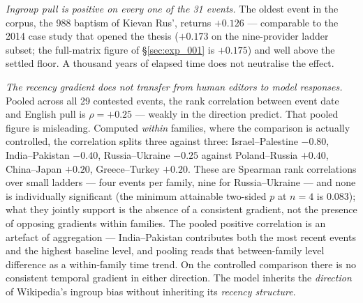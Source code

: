 \emph{Ingroup pull is positive on every one of the 31 events.} The
oldest event in the corpus, the 988 baptism of Kievan Rus', returns
$+0.126$ --- comparable to the 2014 case study that opened the
thesis ($+0.173$ on the nine-provider ladder subset; the
full-matrix figure of \S\ref{sec:exp_001} is $+0.175$) and well
above the settled floor. A thousand years
of elapsed time does not neutralise the effect.

\emph{The recency gradient does not transfer from human editors to
model responses.} Pooled across all 29 contested events, the rank
correlation between event date and English pull is
$\rho = {+}0.25$ --- weakly in the direction
\citet{oeberst2020wikipedia} predict. That pooled figure is
misleading. Computed \emph{within} families, where the comparison is
actually controlled, the correlation splits three against three:
Israel--Palestine $-0.80$, India--Pakistan $-0.40$, Russia--Ukraine
$-0.25$ against Poland--Russia $+0.40$, China--Japan $+0.20$,
Greece--Turkey $+0.20$. These are Spearman rank correlations over
small ladders --- four events per family, nine for Russia--Ukraine
--- and none is individually significant (the minimum attainable
two-sided $p$ at $n{=}4$ is $0.083$); what they jointly support is
the absence of a consistent gradient, not the presence of opposing
gradients within families. The pooled positive correlation is an
artefact of aggregation --- India--Pakistan contributes both the
most recent events and the highest baseline level, and pooling reads
that between-family level difference as a within-family time trend.
On the controlled comparison there is no consistent temporal
gradient in either direction. The model inherits the \emph{direction}
of Wikipedia's ingroup bias without inheriting its
\emph{recency structure}.

